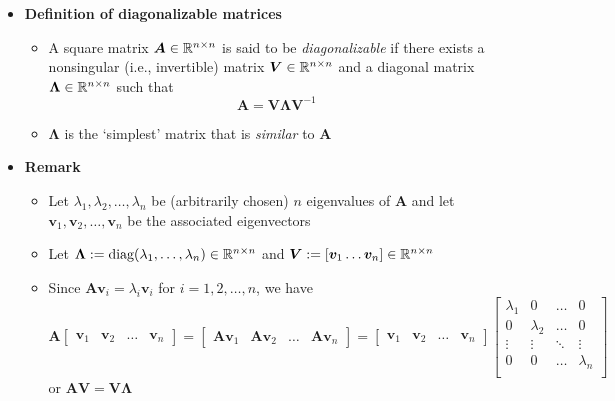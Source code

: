 \documentclass[12pt,a4paper]{article}
\begin{document}
\begin{itemize}
\item \textbf{Definition of diagonalizable matrices}
  \begin{itemize}
  \item A square matrix $\bm{A}\in \mathbb{R}^{n\times n}$ is said to be \emph{diagonalizable}
    if there exists a nonsingular (i.e., invertible) matrix $\bm{V}\in \mathbb{R}^{n\times n}$
    and a diagonal matrix $\bm{\Lambda}\in \mathbb{R}^{n\times n}$ such that
    \begin{equation}\nonumber%
      \bm{A} = \bm{V}\bm{\Lambda}\bm{V}^{-1}
    \end{equation}
  \item $\bm{\Lambda}$ is the `simplest' matrix that is \emph{similar} to $\bm{A}$
  \end{itemize}
\item \textbf{Remark}
  \begin{itemize}
  \item Let $\lambda_{1},\lambda_{2},\ldots, \lambda_{n}$ be (arbitrarily chosen) $n$ eigenvalues of $\bm{A}$ 
    and let $\bm{v}_{1}, \bm{v}_{2}, \ldots, \bm{v}_{n}$ be the associated eigenvectors
  \item Let $\bm{\Lambda}:=\text{diag}(\lambda_{1},\ldots, \lambda_{n})\in \mathbb{R}^{n\times n}$
    and $\bm{V}:=[\bm{v}_{1} \ldots \bm{v}_{n}]\in \mathbb{R}^{n\times n}$
  \item Since $\bm{A}\bm{v}_{i} = \lambda_{i}\bm{v}_{i}$ for $i=1,2,\ldots, n$, we have
    \begin{equation}\nonumber%
      \bm{A}
      \begin{bmatrix}
        \bm{v}_{1} & \bm{v}_{2} & \ldots & \bm{v}_{n}
      \end{bmatrix}
      =
      \begin{bmatrix}
        \bm{A}\bm{v}_{1} & \bm{A}\bm{v}_{2} & \ldots & \bm{A}\bm{v}_{n}
      \end{bmatrix}
      =
      \begin{bmatrix}
        \bm{v}_{1} & \bm{v}_{2} & \ldots & \bm{v}_{n}
      \end{bmatrix}
      \begin{bmatrix}
        \lambda_{1} & 0 & \dots & 0 \\
        0 & \lambda_{2} & \dots & 0 \\
        \vdots & \vdots & \ddots & \vdots \\
        0 & 0 & \dots & \lambda_{n} \\
      \end{bmatrix}
    \end{equation}
    or $\bm{A}\bm{V} = \bm{V}\bm{\Lambda}$
    

\end{itemize}
\end{itemize}
\end{document}
